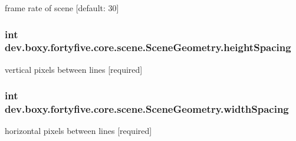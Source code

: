 \label{db/dac/group__scene_ga8d80f585cc4c2089e31b55e12085fcbd}
frame rate of scene \mbox{[}default: 30\mbox{]} \hypertarget{group__scene_ga8b7cd33813c77386f79af2e54ba7ed34}{
\subsubsection[{heightSpacing}]{\setlength{\rightskip}{0pt plus 5cm}int {\bf dev.boxy.fortyfive.core.scene.SceneGeometry.heightSpacing}}}
\label{db/dac/group__scene_ga8b7cd33813c77386f79af2e54ba7ed34}
vertical pixels between lines \mbox{[}required\mbox{]} \hypertarget{group__scene_ga8116f4feebb544338d5cb2bb2f069cba}{
\subsubsection[{widthSpacing}]{\setlength{\rightskip}{0pt plus 5cm}int {\bf dev.boxy.fortyfive.core.scene.SceneGeometry.widthSpacing}}}
\label{db/dac/group__scene_ga8116f4feebb544338d5cb2bb2f069cba}
horizontal pixels between lines \mbox{[}required\mbox{]} 